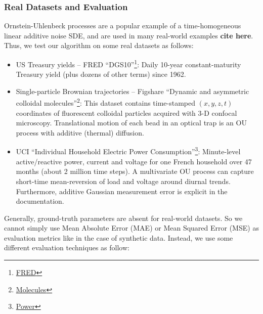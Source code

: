 \documentclass[conference]{IEEEtran}
\begin{document}
\subsubsection{Real Datasets and Evaluation}
Ornstein-Uhlenbeck processes are a popular example of a time-homogeneous linear additive noise SDE, and are used in many real-world examples \textbf{cite here}. Thus, we test our algorithm on some real datasets as follows:
\begin{itemize}
    \item US Treasury yields – FRED “DGS10”\footnote{\href{https://fred.stlouisfed.org/series/DGS10/}{FRED}}: Daily 10-year constant-maturity Treasury yield (plus dozens of other terms) since 1962.
    \item Single-particle Brownian trajectories – Figshare “Dynamic and asymmetric colloidal molecules”\footnote{\href{https://figshare.com/articles/dataset/Raw_dataset_for_the_research_article_Dynamic_and_asymmetric_colloidal_molecules_/28489979}{Molecules}}: This dataset contains time-stamped $(x, y, z, t)$ coordinates of fluorescent colloidal particles acquired with 3-D confocal microscopy. Translational motion of each bead in an optical trap is an OU process with additive (thermal) diffusion.
    \item UCI “Individual Household Electric Power Consumption”\footnote{\href{https://archive.ics.uci.edu/dataset/235/individual+household+electric+power+consumption}{Power}}: Minute-level active/reactive power, current and voltage for one French household over 47 months (about 2 million time steps). A multivariate OU process can capture short-time mean-reversion of load and voltage around diurnal trends. Furthermore, additive Gaussian measurement error is explicit in the documentation.
\end{itemize}
Generally, ground-truth parameters are absent for real-world datasets. So we cannot simply use Mean Absolute Error (MAE) or Mean Squared Error (MSE) as evaluation metrics like in the case of synthetic data. Instead, we use some different evaluation techniques as follow:
\end{document}
